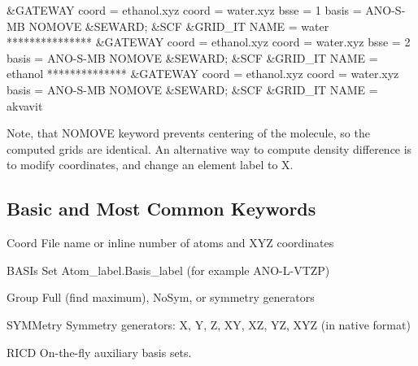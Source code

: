 \begin{inputlisting}
&GATEWAY
coord = ethanol.xyz
coord = water.xyz
bsse  = 1
basis = ANO-S-MB
NOMOVE
&SEWARD; &SCF
&GRID_IT
NAME = water
***************
&GATEWAY
coord = ethanol.xyz
coord = water.xyz
bsse  = 2
basis = ANO-S-MB
NOMOVE
&SEWARD; &SCF
&GRID_IT
NAME = ethanol
**************
&GATEWAY
coord = ethanol.xyz
coord = water.xyz
basis = ANO-S-MB
NOMOVE
&SEWARD; &SCF
&GRID_IT
NAME = akvavit

\end{inputlisting}

Note, that NOMOVE keyword prevents centering of the molecule, so the computed 
grids are identical. An alternative way to compute density difference is to
modify coordinates, and change an element label to X.

\fi

\subsection{ Basic and Most Common Keywords}

\begin{keywordlist}
\item[Coord] File name or inline number of atoms and XYZ coordinates
\item[BASIs Set] Atom\_label.Basis\_label (for example ANO-L-VTZP)
\item[Group] Full (find maximum), NoSym, or symmetry generators
\item[SYMMetry]  Symmetry generators: X, Y, Z, XY, XZ, YZ, XYZ (in native format)
\item[RICD] On-the-fly auxiliary basis sets.
\item[]
\end{keywordlist}
